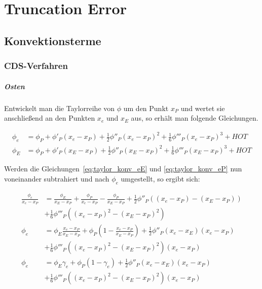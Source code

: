 \documentclass[11pt, ngerman,colorback,accentcolor=tud2d]{tudreport}
\begin{document}
\newcommand{\pder}[2][]{\frac{\partial#1}{\partial#2}}
\newcommand{\pderf}[1]{\frac{\partial f}{\partial#1}}
\newcommand{\pderfs}[1]{\frac{\partial^2 f}{\partial#1}}


\chapter{Truncation Error}
\label{cha:Truncation_Error}

\section{Konvektionsterme}

\subsection{CDS-Verfahren}

\paragraph{Osten}
Entwickelt man die Taylorreihe von $\phi$ um den Punkt $x_P$ und wertet sie anschließend
an den Punkten $x_e$ und $x_E$ aus, so erhält man folgende Gleichungen.

\begin{align}
  \phi_e &= \phi_P + \phi'_P(x_e-x_P)+\frac{1}{2}\phi''_P(x_e-x_P)^2
  +\frac{1}{6}\phi'''_P(x_e-x_P)^3+HOT
  \label{eq:taylor_konv_eP}\\
  \phi_E &= \phi_P + \phi'_P(x_E-x_P)+\frac{1}{2}\phi''_P(x_E-x_P)^2
  +\frac{1}{6}\phi'''_P(x_E-x_P)^3+HOT
  \label{eq:taylor_konv_eE}
\end{align}

Werden die Gleichungen~\eqref{eq:taylor_konv_eE} und \eqref{eq:taylor_konv_eP} nun
voneinander subtrahiert und nach $\phi_e$ umgestellt, so ergibt sich:

\begin{align*}
  \frac{\phi_e}{x_e-x_P} &= \frac{\phi_E}{x_E-x_P} + \frac{\phi_P}{x_e-x_P} -
  \frac{\phi_P}{x_E-x_P} + \frac{1}{2} \phi''_P \left({(x_e-x_P)-(x_E-x_P)}\right)\\
  &+ \frac{1}{6} \phi'''_P \left({(x_e-x_P)^2-(x_E-x_P)^2}\right)\\
  \phi_e &= \phi_E \frac{x_e-x_P}{x_E-x_P} + \phi_P \left({1-\frac{x_e-x_P}{x_E-x_P} }\right)
  + \frac{1}{2} \phi''_P (x_e-x_E)(x_e-x_P)\\
  &+ \frac{1}{6} \phi'''_P \left({(x_e-x_P)^2-(x_E-x_P)^2}\right)(x_e-x_P)\\
  \phi_e &= \phi_E \gamma_e + \phi_P (1-\gamma_e)+ \frac{1}{2} \phi''_P (x_e-x_E)(x_e-x_P)\\
         &+ \frac{1}{6} \phi'''_P \left({(x_e-x_P)^2-(x_E-x_P)^2}\right)(x_e-x_P)
\end{align*}
\end{document}
